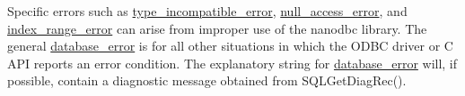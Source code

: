 Specific errors such as {\ttfamily \mbox{\hyperlink{classnanodbc_1_1type__incompatible__error}{type\+\_\+incompatible\+\_\+error}}}, {\ttfamily \mbox{\hyperlink{classnanodbc_1_1null__access__error}{null\+\_\+access\+\_\+error}}}, and {\ttfamily \mbox{\hyperlink{classnanodbc_1_1index__range__error}{index\+\_\+range\+\_\+error}}} can arise from improper use of the nanodbc library. The general {\ttfamily \mbox{\hyperlink{classnanodbc_1_1database__error}{database\+\_\+error}}} is for all other situations in which the O\+D\+BC driver or C A\+PI reports an error condition. The explanatory string for \mbox{\hyperlink{classnanodbc_1_1database__error}{database\+\_\+error}} will, if possible, contain a diagnostic message obtained from {\ttfamily S\+Q\+L\+Get\+Diag\+Rec()}. 